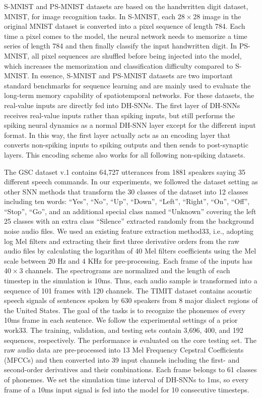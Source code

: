 S-MNIST and PS-MNIST datasets are based on the handwritten digit dataset, MNIST, for image recognition tasks. In S-MNIST, each 28 × 28 image in the original MNIST dataset is converted into a pixel sequence of length 784. Each time a pixel comes to the model, the neural network needs to memorize a time series of length 784 and then finally classify the input handwritten digit. In PS-MNIST, all pixel sequences are shuffled before being injected into the model, which increases the memorization and classification difficulty compared to S-MNIST. In essence, S-MNIST and PS-MNIST datasets are two important standard benchmarks for sequence learning and are mainly used to evaluate the long-term memory capability of spatiotemporal networks. For these datasets, the real-value inputs are directly fed into DH-SNNs. The first layer of DH-SNNs receives real-value inputs rather than spiking inputs, but still performs the spiking neural dynamics as a normal DH-SNN layer except for the different input format. In this way, the first layer actually acts as an encoding layer that converts non-spiking inputs to spiking outputs and then sends to post-synaptic layers. This encoding scheme also works for all following non-spiking datasets.

The GSC dataset v.1 contains 64,727 utterances from 1881 speakers saying 35 different speech commands. In our experiments, we followed the dataset setting as other SNN methods that transform the 30 classes of the dataset into 12 classes including ten words: “Yes”, “No”, “Up”, “Down”, “Left”, “Right”, “On”, “Off”, “Stop”, “Go”, and an additional special class named “Unknown” covering the left 25 classes with an extra class “Silence” extracted randomly from the background noise audio files. We used an existing feature extraction method33, i.e., adopting log Mel filters and extracting their first three derivative orders from the raw audio files by calculating the logarithm of 40 Mel filters coefficients using the Mel scale between 20 Hz and 4 KHz for pre-processing. Each frame of the inputs has 40 × 3 channels. The spectrograms are normalized and the length of each timestep in the simulation is 10ms. Thus, each audio sample is transformed into a sequence of 101 frames with 120 channels. The TIMIT dataset contains acoustic speech signals of sentences spoken by 630 speakers from 8 major dialect regions of the United States. The goal of the tasks is to recognize the phonemes of every 10ms frame in each sentence. We follow the experimental settings of a prior work33. The training, validation, and testing sets contain 3,696, 400, and 192 sequences, respectively. The performance is evaluated on the core testing set. The raw audio data are pre-processed into 13 Mel Frequency Cepstral Coefficients (MFCCs) and then converted into 39 input channels including the first- and second-order derivatives and their combinations. Each frame belongs to 61 classes of phonemes. We set the simulation time interval of DH-SNNs to 1ms, so every frame of a 10ms input signal is fed into the model for 10 consecutive timesteps.

